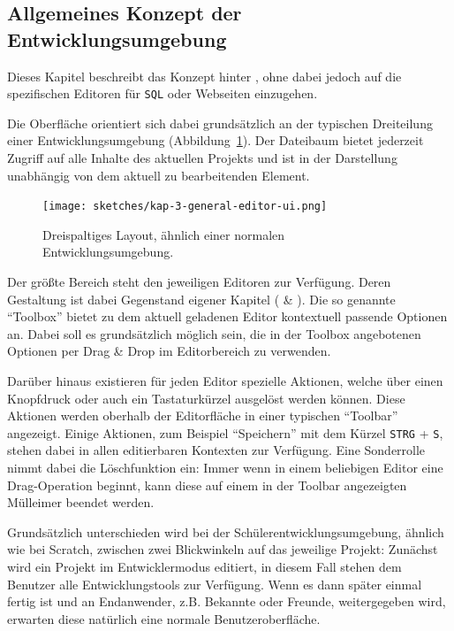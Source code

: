 \subsection{Allgemeines Konzept der Entwicklungsumgebung}
\label{sec:design-general-concept}

Dieses Kapitel beschreibt das Konzept hinter \idename{}, ohne dabei jedoch auf die spezifischen Editoren für \texttt{SQL} oder Webseiten einzugehen.

Die Oberfläche orientiert sich dabei grundsätzlich an der typischen Dreiteilung einer Entwicklungsumgebung (Abbildung~\ref{fig:ui-sketch-general}). Der Dateibaum bietet jederzeit Zugriff auf alle Inhalte des aktuellen Projekts und ist in der Darstellung unabhängig von dem aktuell zu bearbeitenden Element.

\begin{figure}[h]
  \centering \texttt{[image: sketches/kap-3-general-editor-ui.png]}
  \caption{Dreispaltiges Layout, ähnlich einer normalen Entwicklungsumgebung.}
  \label{fig:ui-sketch-general}
\end{figure}

Der größte Bereich steht den jeweiligen Editoren zur Verfügung. Deren Gestaltung ist dabei Gegenstand eigener Kapitel ( \& ). Die so genannte "`Toolbox"' bietet zu dem aktuell geladenen Editor kontextuell passende Optionen an. Dabei soll es grundsätzlich möglich sein, die in der Toolbox angebotenen Optionen per Drag \& Drop im Editorbereich zu verwenden.

Darüber hinaus existieren für jeden Editor spezielle Aktionen, welche über einen Knopfdruck oder auch ein Tastaturkürzel ausgelöst werden können. Diese Aktionen werden oberhalb der Editorfläche in einer typischen "`Toolbar"' angezeigt. Einige Aktionen, zum Beispiel "`Speichern"' mit dem Kürzel \texttt{STRG} + \texttt{S}, stehen dabei in allen editierbaren Kontexten zur Verfügung. Eine Sonderrolle nimmt dabei die Löschfunktion ein: Immer wenn in einem beliebigen Editor eine Drag-Operation beginnt, kann diese auf einem in der Toolbar angezeigten Mülleimer beendet werden.

Grundsätzlich unterschieden wird bei der Schülerentwicklungsumgebung, ähnlich wie bei Scratch, zwischen zwei Blickwinkeln auf das jeweilige Projekt: Zunächst wird ein Projekt im Entwicklermodus editiert, in diesem Fall stehen dem Benutzer alle Entwicklungstools zur Verfügung. Wenn es dann später einmal fertig ist und an Endanwender, z.B. Bekannte oder Freunde, weitergegeben wird, erwarten diese natürlich eine normale Benutzeroberfläche.

